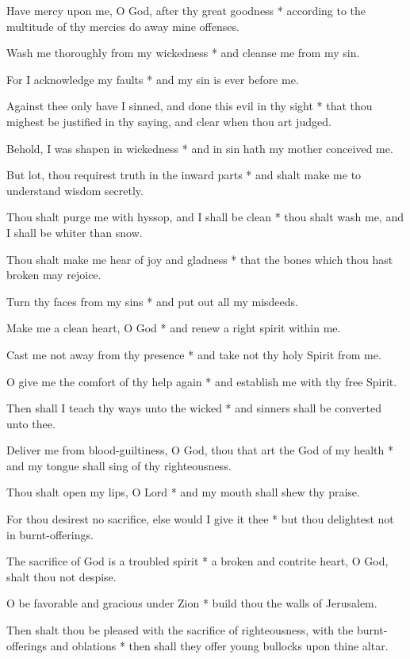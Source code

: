 \begin{multicols}{2}
	
	Have mercy upon me, O God, after thy great goodness * according to the multitude of thy mercies do away mine offenses.
	
	Wash me thoroughly from my wickedness * and cleanse me from my sin.
	
	For I acknowledge my faults * and my sin is ever before me.
	
	Against thee only have I sinned, and done this evil in thy sight * that thou mighest be justified in thy saying, and clear when thou art judged.
	
	Behold, I was shapen in wickedness * and in sin hath my mother conceived me.
	
	But lot, thou requirest truth in the inward parts * and shalt make me to understand wisdom secretly.
	
	Thou shalt purge me with hyssop, and I shall be clean * thou shalt wash me, and I shall be whiter than snow.
	
	Thou shalt make me hear of joy and gladness * that the bones which thou hast broken may rejoice.
	
	Turn thy faces from my sins * and put out all my misdeeds.
	
	Make me a clean heart, O God * and renew a right spirit within me.
	
	Cast me not away from thy presence * and take not thy holy Spirit from me.
	
	O give me the comfort of thy help again * and establish me with thy free Spirit.
	
	Then shall I teach thy ways unto the wicked * and sinners shall be converted unto thee.
	
	Deliver me from blood-guiltiness, O God, thou that art the God of my health * and my tongue shall sing of thy righteousness.
	
	Thou shalt open my lips, O Lord * and my mouth shall shew thy praise.
	
	For thou desirest no sacrifice, else would I give it thee * but thou delightest not in burnt-offerings.
	
	The sacrifice of God is a troubled spirit * a broken and contrite heart, O God, shalt thou not despise.
	
	O be favorable and gracious under Zion * build thou the walls of Jerusalem.
	
	Then shalt thou be pleased with the sacrifice of righteousness, with the burnt-offerings and oblations * then shall they offer young bullocks upon thine altar.
	
	\gloria{}
\end{multicols}
